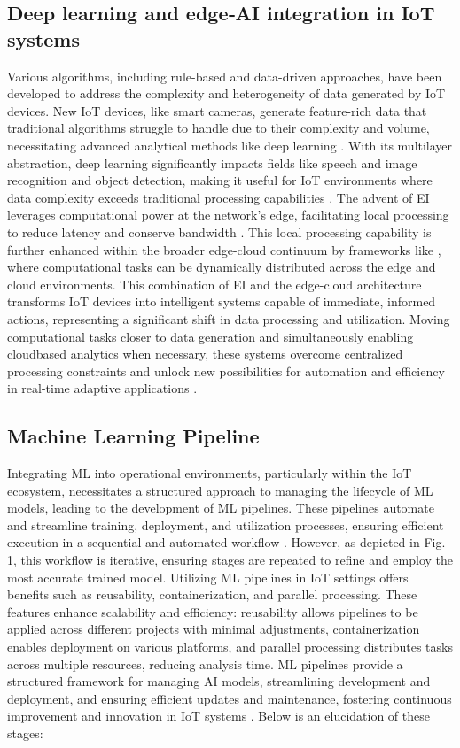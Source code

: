 \documentclass[11pt]{article}
\begin{document}
	\subsection{Deep learning and edge‑AI integration in IoT systems}
	Various algorithms, including rule-based and data-driven approaches, have been
	developed to address the complexity and heterogeneity of data generated by IoT
	devices. New IoT devices, like smart cameras, generate feature-rich data that traditional algorithms struggle to handle due to their complexity and volume, necessitating advanced analytical methods like deep learning \cite{c12}. With its multilayer
	abstraction, deep learning significantly impacts fields like speech and image recognition and object detection, making it useful for IoT environments where data complexity exceeds traditional processing capabilities \cite{c19}. The advent of EI leverages
	computational power at the network’s edge, facilitating local processing to reduce
	latency and conserve bandwidth \cite{c3, c11, c12, c20}. This local processing capability is further enhanced within the broader edge-cloud continuum by frameworks like \cite{c21},
	where computational tasks can be dynamically distributed across the edge and cloud
	environments. This combination of EI and the edge-cloud architecture transforms IoT devices into intelligent systems capable of immediate, informed actions, representing a significant shift in data processing and utilization. Moving	computational tasks closer to data generation and simultaneously enabling cloudbased analytics when necessary, these systems overcome centralized processing constraints and unlock new possibilities for automation and efficiency in real-time adaptive applications \cite{c12, c13}.
	
	\subsection{Machine Learning Pipeline}
	Integrating ML into operational environments, particularly within the IoT ecosystem, necessitates a structured approach to managing the lifecycle of ML models, leading to the development of ML pipelines. These pipelines automate and
	streamline training, deployment, and utilization processes, ensuring efficient
	execution in a sequential and automated workflow \cite{c23}. However, as depicted
	in Fig. 1, this workflow is iterative, ensuring stages are repeated to refine and
	employ the most accurate trained model. Utilizing ML pipelines in IoT settings
	offers benefits such as reusability, containerization, and parallel processing.
	These features enhance scalability and efficiency: reusability allows pipelines
	to be applied across different projects with minimal adjustments, containerization enables deployment on various platforms, and parallel processing distributes
	tasks across multiple resources, reducing analysis time. ML pipelines provide a
	structured framework for managing AI models, streamlining development and
	deployment, and ensuring efficient updates and maintenance, fostering continuous improvement and innovation in IoT systems \cite{c24}. Below is an elucidation of
	these stages:
	
\end{document}

